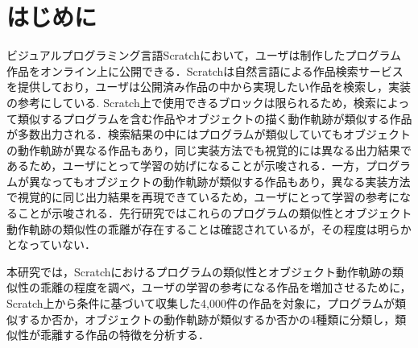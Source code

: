 \documentclass[T,J]{fose} %
\begin{document}
\maketitle \thispagestyle {empty}
\vspace{-7pt}
\section{はじめに}

ビジュアルプログラミング言語Scratchにおいて，ユーザは制作したプログラム作品をオンライン上に公開できる．Scratchは自然言語による作品検索サービスを提供しており，ユーザは公開済み作品の中から実現したい作品を検索し，実装の参考にしている\cite{Resnick_2009}.
Scratch上で使用できるブロックは限られるため，検索によって類似するプログラムを含む作品やオブジェクトの描く動作軌跡が類似する作品が多数出力される．検索結果の中にはプログラムが類似していてもオブジェクトの動作軌跡が異なる作品もあり，同じ実装方法でも視覚的には異なる出力結果であるため，ユーザにとって学習の妨げになることが示唆される．一方，プログラムが異なってもオブジェクトの動作軌跡が類似する作品もあり，異なる実装方法で視覚的に同じ出力結果を再現できているため，ユーザにとって学習の参考になることが示唆される．先行研究\cite{Fukuchi2021}\cite{Mikura2022}ではこれらのプログラムの類似性とオブジェクト動作軌跡の類似性の乖離が存在することは確認されているが，その程度は明らかとなっていない．

本研究では，Scratchにおけるプログラムの類似性とオブジェクト動作軌跡の類似性の乖離の程度を調べ，ユーザの学習の参考になる作品を増加させるために，Scratch上から条件に基づいて収集した4,000件の作品を対象に，プログラムが類似するか否か，オブジェクトの動作軌跡が類似するか否かの4種類に分類し，類似性が乖離する作品の特徴を分析する．

\vspace{-7pt}
\end{document}
